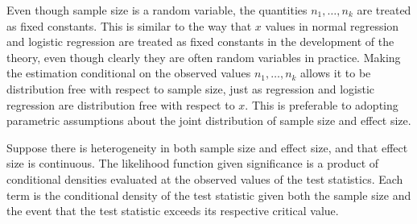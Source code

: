 \documentclass[jou]{apa6} %
\begin{document}
Even though sample size is a random variable, the quantities $n_1, \ldots, n_k$ are treated as fixed constants. This is similar to the way that $x$ values in normal regression and logistic regression are treated as fixed constants in the development of the theory, even though clearly they are often random variables in practice. Making the estimation conditional on the observed values $n_1, \ldots, n_k$ allows it to be distribution free with respect to sample size, just as regression and logistic regression are distribution free with respect to $x$. This is preferable to adopting parametric assumptions about the joint distribution of sample size and effect size.


Suppose there is heterogeneity in both sample size and effect size, and that effect size is continuous. The likelihood function given significance is a product of conditional densities evaluated at the observed values of the test statistics.
Each term is the conditional density of the test statistic given both the sample size and the event that the test statistic exceeds its respective critical value.  %
\end{document}

